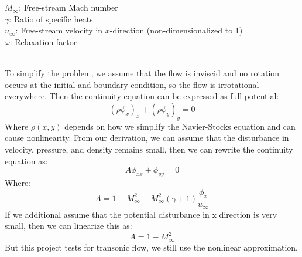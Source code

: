 \documentclass[12pt]{article}
\theoremstyle{definition}
\begin{document}
\noindent {} \hspace{1.3cm}  \hspace{1.3cm} \\
\vspace{1cm} 

\\
$M_\infty$: Free-stream Mach number \\
$\gamma$: Ratio of specific heats \\
$u_\infty$: Free-stream velocity in $x$-direction (non-dimensionalized to 1)\\
$\omega$: Relaxation factor
\vspace{1cm} 


\\
To simplify the problem, we assume that the flow is inviscid and no rotation occurs at the initial and boundary condition, so the flow is irrotational everywhere. Then the continuity equation can be expressed as full potential:
\begin{equation}
    (\rho \phi_x)_x + (\rho \phi_y)_y = 0
\end{equation}
Where $\rho(x,y)$ depends on how we simplify the Navier-Stocks equation and can cause nonlinearity. From our derivation, we can assume that the disturbance in velocity, pressure, and density remains small, then we can rewrite the continuity equation as:
\begin{equation}
    A \phi_{xx} + \phi_{yy} = 0
\end{equation}
Where:
\begin{equation}
    A = 1 - M_\infty^2 - M_\infty^2(\gamma + 1) \frac{\phi_x}{u_\infty}
\end{equation}
If we additional assume that the potential disturbance in x direction is very small, then we can linearize this  as:
\begin{equation}
    A = 1 - M_\infty^2
\end{equation}
But this project tests for transonic flow, we still use the nonlinear approximation.\\
\vspace{1cm}
\end{document}
